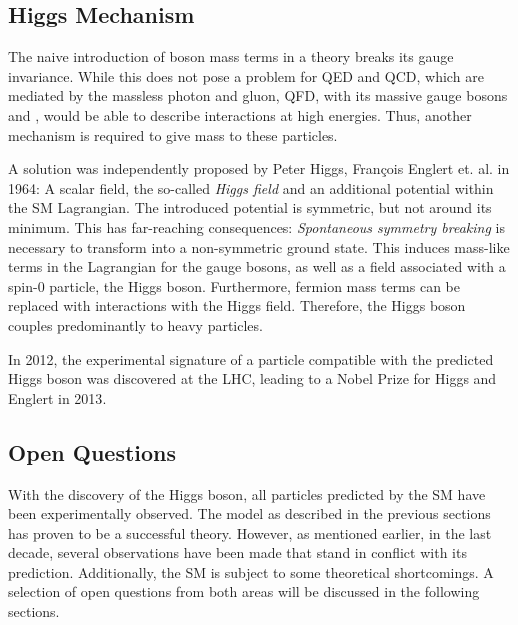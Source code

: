 \subsection{Higgs Mechanism}
The naive introduction of boson mass terms in a theory breaks its gauge invariance. While this does not pose a problem for \ac{QED} and \ac{QCD}, which are mediated by the massless photon and gluon, \ac{QFD}, with its massive gauge bosons \PW and \PZ, would be able to describe interactions at high energies.
Thus, another mechanism is required to give mass to these particles.

A solution was independently proposed by Peter Higgs\cite{Higgs:BrokenSymmetriesMasses}, François Englert et. al. \cite{Englert:BrokenSymmetryMass} in 1964: A scalar field, the so-called \emph{Higgs field} and an additional potential within the \ac{SM} Lagrangian. The introduced potential is symmetric, but not around its minimum. This has far-reaching consequences: \emph{Spontaneous symmetry breaking} is necessary to transform into a non-symmetric ground state. This induces mass-like terms in the Lagrangian for the gauge bosons, as well as a field associated with a spin-0 particle, the Higgs boson. Furthermore, fermion mass terms can be replaced with interactions with the Higgs field. Therefore, the Higgs boson couples predominantly to heavy particles.

In 2012, the experimental signature of a particle compatible with the predicted Higgs boson was discovered at the \ac{LHC}\cite{CMSCollaboration:Observationnewboson,ATLASCollaboration:Observationnewparticle}, leading to a Nobel Prize for Higgs and Englert in 2013\cite{NobelMedia:NobelPrize2013}.

\subsection{Open Questions}
\label{sec:open_questions}

With the discovery of the Higgs boson, all particles predicted by the \acl{SM} have been experimentally observed. The model as described in the previous sections has proven to be a successful theory. 
However, as mentioned earlier, in the last decade, several observations have been made that stand in conflict with its prediction. Additionally, the \acl{SM} is subject to some theoretical shortcomings. A selection of open questions from both areas will be discussed in the following sections.



